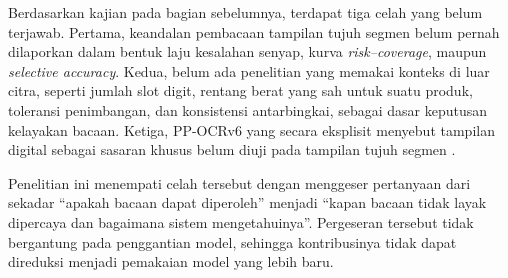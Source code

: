 Berdasarkan kajian pada bagian sebelumnya, terdapat tiga celah yang belum
terjawab. Pertama, keandalan pembacaan tampilan tujuh segmen belum pernah
dilaporkan dalam bentuk laju kesalahan senyap, kurva \textit{risk--coverage},
maupun \textit{selective accuracy}. Kedua, belum ada penelitian yang memakai
konteks di luar citra, seperti jumlah slot digit, rentang berat yang sah untuk
suatu produk, toleransi penimbangan, dan konsistensi antarbingkai, sebagai dasar
keputusan kelayakan bacaan. Ketiga, PP-OCRv6 yang secara eksplisit menyebut
tampilan digital sebagai sasaran khusus belum diuji pada tampilan tujuh segmen
\parencite{zhang2026ppocrv6}.

Penelitian ini menempati celah tersebut dengan menggeser pertanyaan dari sekadar
``apakah bacaan dapat diperoleh'' menjadi ``kapan bacaan tidak layak dipercaya
dan bagaimana sistem mengetahuinya''. Pergeseran tersebut tidak bergantung pada
penggantian model, sehingga kontribusinya tidak dapat direduksi menjadi
pemakaian model yang lebih baru.

